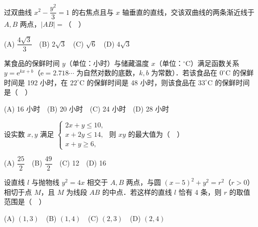 \begin{question}
过双曲线 \(x^2-\dfrac{y^2}{3}=1\) 的右焦点且与 \(x\) 轴垂直的直线，交该双曲线的两条渐近线于 \(A,B\) 两点，\(|AB|=\)（　）

(A) \(\dfrac{4\sqrt{3}}{3}\)　(B) \(2\sqrt{3}\)　(C) \(\sqrt{6}\)　(D) \(4\sqrt{3}\)

\end{question}
\begin{question}
某食品的保鲜时间 \(y\)（单位：小时）与储藏温度 \(x\)（单位：\(^{\circ}\mathrm{C}\)）满足函数关系 \(y=\mathrm{e}^{kx+b}\)（\(\mathrm{e}=2.718\cdots\) 为自然对数的底数，\(k,b\) 为常数）．若该食品在 \(0^{\circ}\mathrm{C}\) 的保鲜时间是 192 小时，在 \(22^{\circ}\mathrm{C}\) 的保鲜时间是 48 小时，则该食品在 \(33^{\circ}\mathrm{C}\) 的保鲜时间是（　）

(A) 16 小时　(B) 20 小时　(C) 24 小时　(D) 28 小时

\end{question}
\begin{question}
设实数 \(x,y\) 满足 \(\begin{cases}2x+y\leqslant 10,\\ x+2y\leqslant 14,\\ x+y\geqslant 6,\end{cases}\) 则 \(xy\) 的最大值为（　）

(A) \(\dfrac{25}{2}\)　(B) \(\dfrac{49}{2}\)　(C) 12　(D) 16

\end{question}
\begin{question}
设直线 \(l\) 与抛物线 \(y^2=4x\) 相交于 \(A,B\) 两点，与圆 \((x-5)^2+y^2=r^2\)（\(r>0\)）相切于点 \(M\)，且 \(M\) 为线段 \(AB\) 的中点．若这样的直线 \(l\) 恰有 4 条，则 \(r\) 的取值范围是（　）

(A) \((1,3)\)　(B) \((1,4)\)　(C) \((2,3)\)　(D) \((2,4)\)

\end{question}

